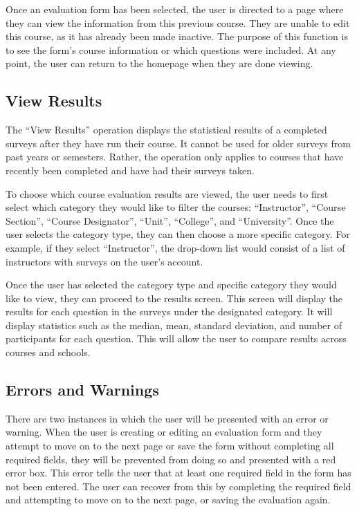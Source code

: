 \documentclass{article}
\begin{document}
Once an evaluation form has been selected, the user is directed to a page where they can view the information from this previous course. They are unable to edit this course, as it has already been made inactive. The purpose of this function is to see the form's course information or which questions were included. At any point, the user can return to the homepage when they are done viewing.

\subsection{View Results}

The ``View Results'' operation displays the statistical results of a completed surveys after they have run their course. It cannot be used for older surveys from past years or semesters. Rather, the operation only applies to courses that have recently been completed and have had their surveys taken.

To choose which course evaluation results are viewed, the user needs to first select which category they would like to filter the courses: ``Instructor'', ``Course Section'', ``Course Designator'', ``Unit'', ``College'', and ``University''. Once the user selects the category type, they can then choose a more specific category. For example, if they select ``Instructor'', the drop-down list would consist of a list of instructors with surveys on the user's account. 

Once the user has selected the category type and specific category they would like to view, they can proceed to the results screen. This screen will display the results for each question in the surveys under the designated category. It will display statistics such as the median, mean, standard deviation, and number of participants for each question. This will allow the user to compare results across courses and schools.

\subsection{Errors and Warnings}

There are two instances in which the user will be presented with an error or warning. When the user is creating or editing an evaluation form and they attempt to move on to the next page or save the form without completing all required fields, they will be prevented from doing so and presented with a red error box. This error tells the user that at least one required field in the form has not been entered. The user can recover from this by completing the required field and attempting to move on to the next page, or saving the evaluation again.
\end{document}
